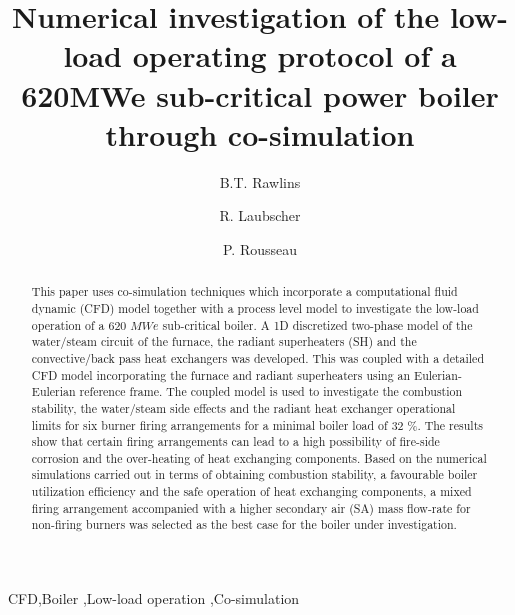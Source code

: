 \documentclass[review]{elsarticle}
\begin{document}
\begin{frontmatter}

\title{Numerical investigation of the low-load operating protocol of a 620MWe sub-critical power boiler through co-simulation}

\author{B.T. Rawlins}
\author{R. Laubscher}
\author{P. Rousseau}
\address{Department of Mechanical Engineering, Applied Thermal-Fluid Process Modeling Research Unit, University of Cape Town, Library Rd, Rondebosch, Cape Town, 7701, South Africa}

\begin{abstract}
This paper uses co-simulation techniques which incorporate a computational fluid dynamic (CFD) model together with a process level model to investigate the low-load operation of a 620 $MWe$ sub-critical boiler. A 1D discretized two-phase model of the water/steam circuit of the furnace, the radiant superheaters (SH) and the convective/back pass heat exchangers was developed. This was coupled with a detailed CFD model incorporating the furnace and radiant superheaters using an Eulerian-Eulerian reference frame. The coupled model is used to investigate the combustion stability, the water/steam side effects and the radiant heat exchanger operational limits for six burner firing arrangements for a minimal boiler load of 32 \%. The results show that certain firing arrangements can lead to a high possibility of fire-side corrosion and the over-heating of heat exchanging components. Based on the numerical simulations carried out in terms of obtaining combustion stability, a favourable boiler utilization efficiency and the safe operation of heat exchanging components, a mixed firing arrangement accompanied with a higher secondary air (SA) mass flow-rate for non-firing burners was selected as the best case for the boiler under investigation.
\end{abstract}

\begin{keyword}
CFD\sep Boiler \sep Low-load operation \sep Co-simulation
\end{keyword}
\newpage
\end{frontmatter}

\printnomenclature
\end{document}
